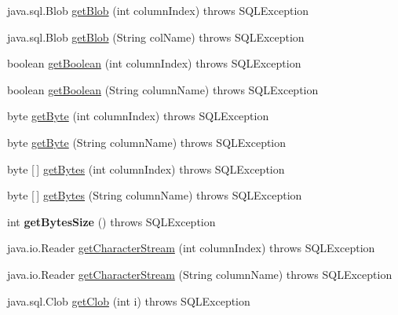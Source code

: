 \begin{DoxyCompactItemize}
java.\+sql.\+Blob \mbox{\hyperlink{classcom_1_1mysql_1_1jdbc_1_1_result_set_impl_a7b0c52d7730359b0a6dcf0f8ad4b9592}{get\+Blob}} (int column\+Index)  throws S\+Q\+L\+Exception 
\item 
java.\+sql.\+Blob \mbox{\hyperlink{classcom_1_1mysql_1_1jdbc_1_1_result_set_impl_a4ff048c74bbfa3ff0584ac97b8679e84}{get\+Blob}} (String col\+Name)  throws S\+Q\+L\+Exception 
\item 
boolean \mbox{\hyperlink{classcom_1_1mysql_1_1jdbc_1_1_result_set_impl_ad64d18ed9c29fd6ab29f1770b2184d6e}{get\+Boolean}} (int column\+Index)  throws S\+Q\+L\+Exception 
\item 
boolean \mbox{\hyperlink{classcom_1_1mysql_1_1jdbc_1_1_result_set_impl_ac2abb257261b4664efc91722949ad378}{get\+Boolean}} (String column\+Name)  throws S\+Q\+L\+Exception 
\item 
byte \mbox{\hyperlink{classcom_1_1mysql_1_1jdbc_1_1_result_set_impl_aa8f3b2bde47957027d8741c7ec1bd488}{get\+Byte}} (int column\+Index)  throws S\+Q\+L\+Exception 
\item 
byte \mbox{\hyperlink{classcom_1_1mysql_1_1jdbc_1_1_result_set_impl_a026c2532a7205235f2f6bc3537f6add6}{get\+Byte}} (String column\+Name)  throws S\+Q\+L\+Exception 
\item 
byte \mbox{[}$\,$\mbox{]} \mbox{\hyperlink{classcom_1_1mysql_1_1jdbc_1_1_result_set_impl_a128a017a783b29ee921fe5ad959136fe}{get\+Bytes}} (int column\+Index)  throws S\+Q\+L\+Exception 
\item 
byte \mbox{[}$\,$\mbox{]} \mbox{\hyperlink{classcom_1_1mysql_1_1jdbc_1_1_result_set_impl_a0c4ba0624ab9ded2a2decf15d66e855d}{get\+Bytes}} (String column\+Name)  throws S\+Q\+L\+Exception 
\item 
\mbox{\label{classcom_1_1mysql_1_1jdbc_1_1_result_set_impl_af1dd51375fe9ac79539b2780a8b49d1a}} 
int {\bfseries get\+Bytes\+Size} ()  throws S\+Q\+L\+Exception 
\item 
java.\+io.\+Reader \mbox{\hyperlink{classcom_1_1mysql_1_1jdbc_1_1_result_set_impl_a941ea1683438a62fca25a1553e10e6e4}{get\+Character\+Stream}} (int column\+Index)  throws S\+Q\+L\+Exception 
\item 
java.\+io.\+Reader \mbox{\hyperlink{classcom_1_1mysql_1_1jdbc_1_1_result_set_impl_aba214197b5cf31aa7baee241a2ce91a2}{get\+Character\+Stream}} (String column\+Name)  throws S\+Q\+L\+Exception 
\item 
java.\+sql.\+Clob \mbox{\hyperlink{classcom_1_1mysql_1_1jdbc_1_1_result_set_impl_a9a0298e829cc6e29bf17f112e310dc0b}{get\+Clob}} (int i)  throws S\+Q\+L\+Exception 

\end{DoxyCompactItemize}
